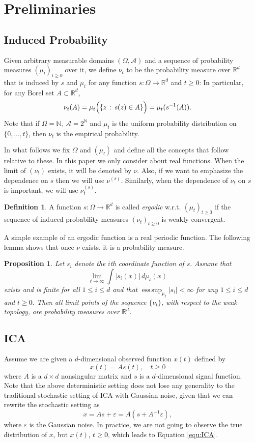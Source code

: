 \documentclass[twoside]{article}
\newcommand{\scom}[1]{s_{#1}}
\newcommand{\cset}[2]{\left\{#1\,:\,#2\right\}}
\newcommand{\ra}{\rightarrow}
\newcommand{\real}{\mathbb{R}}
\DeclareMathOperator{\esssup}{ess\,sup}
\renewcommand{\natural}{\mathbb{N}}
\newtheorem{prop}[lemma]{Proposition}
\theoremstyle{definition}
\newtheorem{definition}[lemma]{Definition}
\renewcommand{\AA}{\mathcal{A}}
\newcommand{\eps}{\varepsilon}
\begin{document}
\section{Preliminaries}
\label{sec:Preliminaries}
\subsection{Induced Probability}
\label{subsec:InducesProb}
Given arbitrary measurable domains $(\Omega,\AA)$ and a sequence of probability measures $(\mu_t)_{t\ge0}$ over it, we define $\nu_t$ to be the probability measure over $\real^d$ that is induced by $s$ and $\mu_t$ for any function $s: \Omega \ra \real^d$ and $t\ge 0$:
In particular, for any Borel set $A\subset \real^d$,
\[
\nu_t(A)= \mu_t\Bigl( \cset{z}{s(z)\in A} \Bigr)
= \mu_t ( s^{-1}(A) ).
\]
Note that if $\Omega = \natural$, $\AA = 2^\natural$ and $\mu_t$ is the uniform probability distribution on $\{0,\ldots,t\}$, then $\nu_t$ is the empirical probability.

In what follows we fix $\Omega$ and $(\mu_t)$ and define all the concepts that follow relative to these. 
In this paper we only consider about real functions.
When the limit of $(\nu_t)$ exists, it will be denoted by $\nu$.
Also, if we want to emphasize the dependence on $s$ then we will use $\nu^{(s)}$.
Similarly, when the dependence of $\nu_t$ on $s$ is important, we will use $\nu^{(s)}_t$.
\begin{definition}
A function $s:\Omega \rightarrow \real^d$ is called \emph{ergodic} w.r.t. $(\mu_t)_{t\ge0}$
if the sequence of  induced probability measures $(\nu_t)_{t\ge 0}$ is weakly convergent.
\end{definition}
A simple example of an ergodic function is a real periodic function.
The following lemma shows that once $\nu$ exists, it is a probability measure. 
\begin{prop}
\label{prop:ergodicfunction}
Let $\scom{i}$ denote the $i$th coordinate function of $s$. Assume that
\[
\lim_{t\to\infty} \int |\scom{i}(x)|\, d\mu_t(x) 
\]
exists and is finite for all $1 \le i \le d$ and that $\esssup_{\mu_t} |\scom{i}|<\infty$ for any $1\le i \le d$ and $t\ge 0$.
Then all limit points of the sequence $\{\nu_t\}$, with respect to the weak topology, are probability measures over $\real^d$.
\end{prop}
\subsection{ICA}
\label{subsec:ICA}
Assume we are given a $d$-dimensional observed function $x(t)$ defined by  
\begin{equation}
\label{equ:ICA}
x(t) = As(t), \quad t\ge0
\end{equation}
where $A$ is a $d\times d$ nonsingular matrix and  $s$ is a $d$-dimensional signal function. 
Note that the above deterministic setting does not lose any generality to the traditional stochastic setting of ICA with Gaussian noise, given that we can rewrite the stochastic setting as 
\[
x = As+\eps = A(s+A^{-1}\eps),
\] 
where $\eps$ is the Gaussian noise. In practice, we are not going to observe the true distribution of $x$, but $x(t)$, $t\ge 0$, which leads to Equation \eqref{equ:ICA}.
\end{document}
